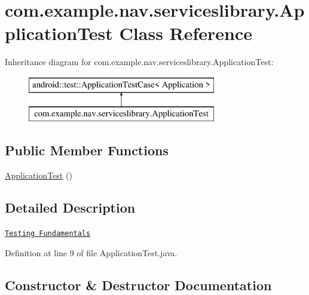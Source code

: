\hypertarget{classcom_1_1example_1_1nav_1_1serviceslibrary_1_1_application_test}{}\section{com.\+example.\+nav.\+serviceslibrary.\+Application\+Test Class Reference}
\label{classcom_1_1example_1_1nav_1_1serviceslibrary_1_1_application_test}
Inheritance diagram for com.\+example.\+nav.\+serviceslibrary.\+Application\+Test\+:\begin{figure}[H]
\begin{center}
\leavevmode
\includegraphics[height=2.000000cm]{classcom_1_1example_1_1nav_1_1serviceslibrary_1_1_application_test}
\end{center}
\end{figure}
\subsection*{Public Member Functions}
\begin{DoxyCompactItemize}
\item 
\hyperlink{classcom_1_1example_1_1nav_1_1serviceslibrary_1_1_application_test_a16f43927ccf102b8756c29c2644d50e0}{Application\+Test} ()
\end{DoxyCompactItemize}


\subsection{Detailed Description}
\href{http://d.android.com/tools/testing/testing_android.html}{\tt Testing Fundamentals} 

Definition at line 9 of file Application\+Test.\+java.



\subsection{Constructor \& Destructor Documentation}
